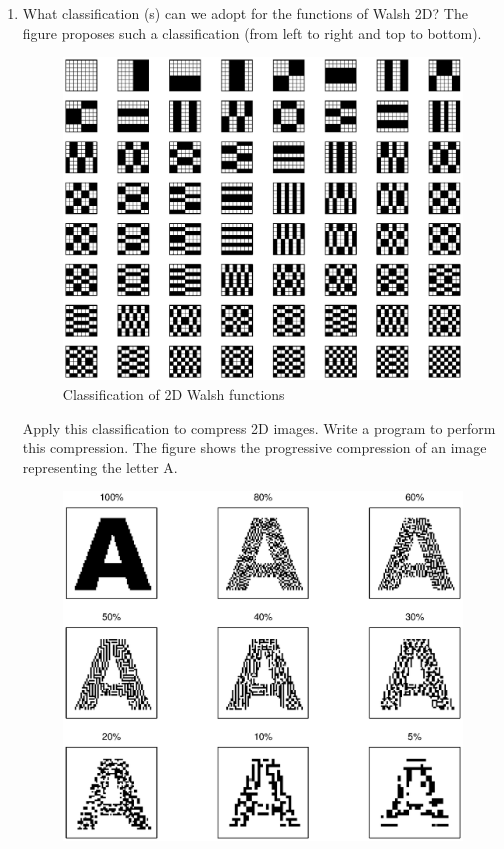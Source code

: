 \begin{exo}
\begin{enumerate}
\item What classification (s) can we adopt for the functions of Walsh 2D? The figure  proposes such a classification (from left to right and top to bottom). \begin{figure}[ht]
    \begin{center}
    \includegraphics [scale = 0.6]{images/fonctions-walsh-2d.eps}
    \end{center}
    \caption{Classification of 2D Walsh functions}
              \label{fig-functions-walsh-2d}
\end{figure}
Apply this classification to compress 2D images. Write a \Matlab{} program to perform this compression. The figure  shows the progressive compression of an image representing the letter A. \begin{figure}[ht]
    \begin{center}
    \includegraphics [scale = 0.6]{images/compression-walsh-2d.eps}

\end{center}
\end{figure}
\end{enumerate}
\end{exo}
